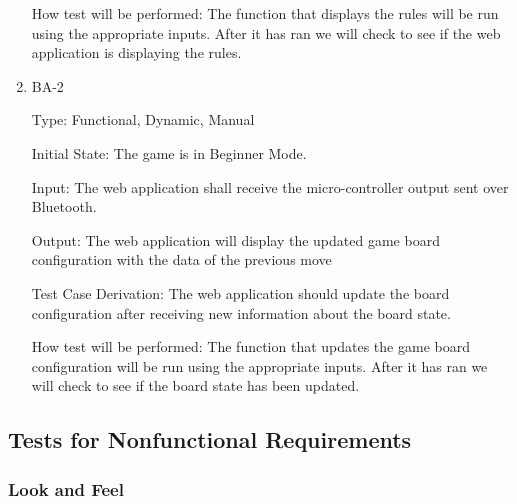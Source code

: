 \documentclass[12pt, titlepage]{article}
\begin{document}
\begin{enumerate}
      How test will be performed: The function that displays the rules
      will be run using the appropriate inputs. After it has ran we will check to see if the web application is displaying the rules.
  
      \item{BA-2\\}
  
      Type: Functional, Dynamic, Manual
                        
      Initial State: The game is in Beginner Mode.
                          
      Input: The web application shall receive the micro-controller output sent over Bluetooth.
                          
      Output: The web application will display the updated game board configuration with the data
      of the previous move
                          
      Test Case Derivation: The web application should update the board configuration after receiving new information about the board state. 
  
      How test will be performed: The function that updates the game board configuration
      will be run using the appropriate inputs. After it has ran we will check to see if the board state has been updated.
  
    \end{enumerate}

\subsection{Tests for Nonfunctional Requirements}



\subsubsection{Look and Feel}
\end{document}
